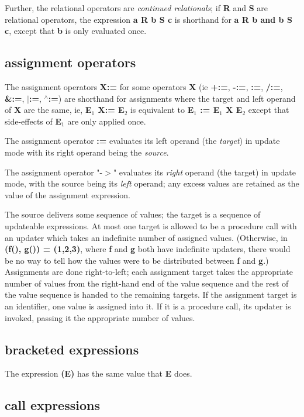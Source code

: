\documentclass{report}
\begin{document}
Further, the relational operators are {\em continued relationals}; if {\bf R} and {\bf S}
are relational operators, the expression {\bf a R b S c} is shorthand for {\bf a R b
and b S c}, except that {\bf b} is only evaluated once.\subsection{assignment operators}


The assignment operators {\bf X:=} for some operators {\bf X} (ie {\bf +:=}, {\bf -:=},
{\bf *:=}, {\bf /:=}, {\bf \&:=}, {\bf $\mid$:=}, {\bf $^\wedge$:=}) are shorthand for assignments where
the target and left operand of {\bf X} are the same, ie, {\bf E$_ 1$ X:= E$_ 2$} is
equivalent to {\bf E$_ 1$ := E$_ 1$ X E$_ 2$} except that side-effects of {\bf E$_ 1$}
are only applied once.

The assignment operator {\bf :=} evaluates its left operand (the {\em target}) in
update mode with its right operand being the {\em source}.

The assignment operator "-$>$" evaluates its {\em right} operand (the target) in
update mode, with the source being its {\em left} operand; any excess values are
retained as the value of the assignment expression.

The source delivers some sequence of values; the target is a sequence of
updateable expressions. At most one target is allowed to be a procedure call
with an updater which takes an indefinite number of assigned values.
(Otherwise, in {\bf (f(), g()) = (1,2,3)}, where {\bf f} and {\bf g} both have indefinite
updaters, there would be no way to tell how the values were to be distributed
between {\bf f} and {\bf g}.) Assignments are done right-to-left; each
assignment target takes the appropriate number of values from the right-hand
end of the value sequence and the rest of the value sequence is handed to the
remaining targets. If the assignment target is an identifier, one value is
assigned into it. If it is a procedure call, its updater is invoked, passing
it the appropriate number of values.\subsection{bracketed expressions}


The expression {\bf (E)} has the same value that {\bf E} does.\subsection{call expressions}
\end{document}
